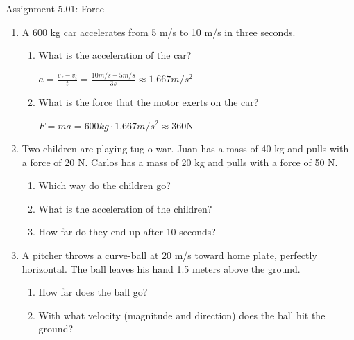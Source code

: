 \documentclass[letterpaper, 12pt]{article}
\begin{document}


\begin{center} Assignment 5.01: Force
\end{center}
\vspace{-.3in}
\begin{enumerate}
\item A 600 kg car accelerates from 5 m/s to 10 m/s in three seconds.
\begin{enumerate}
	\item What is the acceleration of the car?
	
	\color{red}
	$a = \frac{v_f-v_i}{t} = \frac{10 m/s - 5 m/s} {3 s} \approx 1.667 m/s^2$
	
	\color{black}

	\item What is the force that the motor exerts on the car?
	
	\color{red}
	$F = ma = 600kg \cdot 1.667 m/s^2 \approx 360$N
	\color{black}


\end{enumerate}

\item Two children are playing tug-o-war.  Juan has a mass of 40 kg and pulls with a force of 20 N. Carlos has a mass of 20 kg and pulls with a force of 50 N.  
\begin{enumerate}
	\item Which way do the children go?
	\vspace{0.3in}
	\item What is the acceleration of the children?
	\vspace{0.4in}
	\item How far do they end up after 10 seconds?  
	\vspace{0.4in}
\end{enumerate}

\item  A pitcher throws a curve-ball at 20 m/s toward home plate, perfectly horizontal.  The ball leaves his hand 1.5 meters above the ground.  
\begin{enumerate}
	\item How far does the ball go?
	\vspace{0.4in}
	\item With what velocity (magnitude and direction) does the ball hit the ground?
	\vspace{0.4in}
\end{enumerate}



\end{enumerate}
\end{document}
